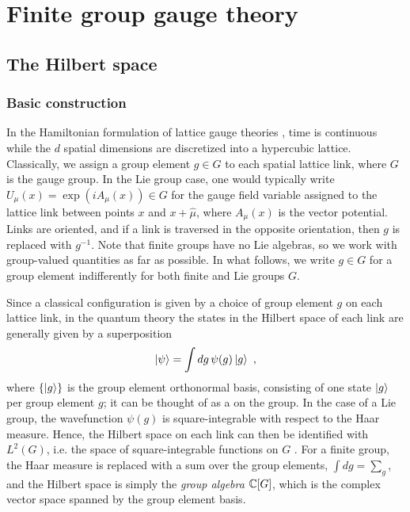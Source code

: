 \section{Finite group gauge theory}\label{sec:hamiltonian formulation}

\subsection{The Hilbert space}

\subsubsection{Basic construction}\label{sec:basic hilbert space}

In the Hamiltonian formulation of lattice gauge theories \cite{kogut1975hamiltonian, milstead2018qyangmills, zohar2015latticegauge}, time is continuous while the $d$ spatial dimensions are discretized into a hypercubic lattice.
Classically, we assign a group element $g \in G$ to each spatial lattice link, where $G$ is the gauge group.
In the Lie group case, one would typically write $U_\mu(x) = \exp{(iA_\mu(x))} \in G$ for the gauge field variable assigned to the lattice link between points $x$ and $x + \hat{\mu}$, where $A_\mu(x)$ is the vector potential.
Links are oriented, and if a link is traversed in the opposite orientation, then $g$ is replaced with $g^{-1}$.
Note that finite groups have no Lie algebras, so we work with group-valued quantities as far as possible.
In what follows, we write $g \in G$ for a group element indifferently for both finite and Lie groups $G$.

\medskip

Since a classical configuration is given by a choice of group element $g$ on each lattice link, in the quantum theory the states in the Hilbert space of each link are generally given by a superposition \cite{milstead2018qyangmills}
\begin{equation}
    \ket{\psi}=\int dg \, \psi(g)\ket{g} \ ,
\end{equation}
where $\{\ket{g}\}$ is the group element orthonormal basis, consisting of one state $\ket{g}$ per group element $g$; it can be thought of as a  on the group.
In the case of a Lie group, the wavefunction $\psi(g)$ is square-integrable with respect to the Haar measure.
Hence, the Hilbert space on each link can then be identified with $L^2(G)$, i.e. the space of square-integrable functions on $G$ \cite{milstead2018qyangmills}.
For a finite group, the Haar measure is replaced with a sum over the group elements, $\int dg = \sum_g$, and the Hilbert space is simply the \textit{group algebra} $\mathbb{C}[G]$, which is the complex vector space spanned by the group element basis.

